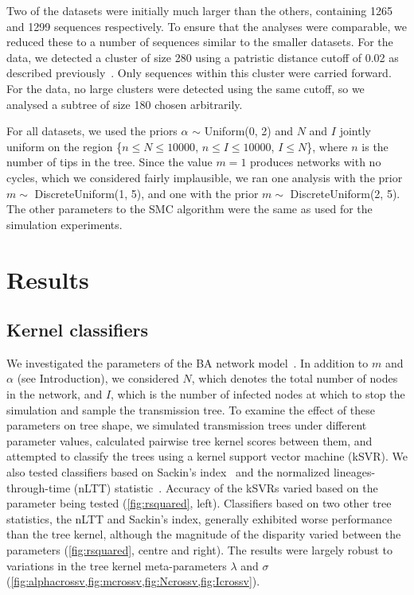 \documentclass[12pt]{article}\usepackage[]{graphicx}\usepackage[]{color}
\begin{document}
Two of the datasets \autocite{li2015hiv,novitsky2014impact} were initially much
larger than the others, containing 1265 and 1299 sequences respectively. To
ensure that the analyses were comparable, we reduced these to a number of
sequences similar to the smaller datasets. For the \textcite{li2015hiv} data,
we detected a cluster of size 280 using a patristic distance cutoff of 0.02 as
described previously~\autocite{poon2015impact}. Only sequences within this
cluster were carried forward. For the \textcite{novitsky2014impact} data, no
large clusters were detected using the same cutoff, so we analysed a subtree of
size 180 chosen arbitrarily.

For all datasets, we used the priors $\alpha$ $\sim$ Uniform(0, 2) and $N$ and
$I$ jointly uniform on the region \{$n \leq N \leq 10000$, $n \leq I \leq
10000$, $I \leq N$\}, where $n$ is the number of tips in the tree. Since the
value $m = 1$ produces networks with no cycles, which we considered fairly
implausible, we ran one analysis with the prior $m \sim$ DiscreteUniform(1, 5),
and one with the prior $m \sim$ DiscreteUniform(2, 5). The other parameters to
the SMC algorithm were the same as used for the simulation experiments.


\section{Results}

\subsection{Kernel classifiers}



We investigated the parameters of the BA network
model~\autocite{barabasi1999emergence}. In addition to $m$ and $\alpha$ (see
Introduction), we considered $N$, which denotes the total number of nodes in
the network, and $I$, which is the number of infected nodes at which to stop
the simulation and sample the transmission tree. To examine the effect of these
parameters on tree shape, we simulated transmission trees under different
parameter values, calculated pairwise tree kernel scores between them, and
attempted to classify the trees using a kernel support vector machine (kSVR).
We also tested classifiers based on Sackin's index~\autocite{shao1990tree} and
the normalized lineages-through-time (nLTT)
statistic~\autocite{janzen2015approximate}. Accuracy of the kSVRs varied based
on the parameter being tested (\cref{fig:rsquared}, left). Classifiers based on
two other tree statistics, the nLTT and Sackin's index, generally exhibited
worse performance than the tree kernel, although the magnitude of the disparity
varied between the parameters (\cref{fig:rsquared}, centre and right). The
results were largely robust to variations in the tree kernel meta-parameters
$\lambda$ and $\sigma$ (\cref{fig:alphacrossv,fig:mcrossv,fig:Ncrossv,fig:Icrossv}).
\end{document}
